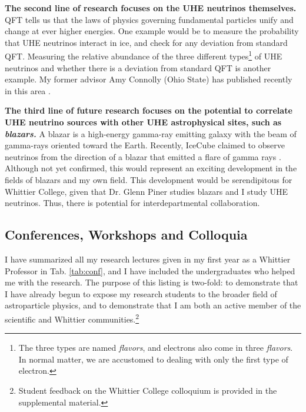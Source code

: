 \documentclass[../../main.tex]{subfiles}
\begin{document}
\textbf{The second line of research focuses on the UHE neutrinos themselves.}  QFT tells us that the laws of physics governing fundamental particles unify and change at ever higher energies.  One example would be to measure the probability that UHE neutrinos interact in ice, and check for any deviation from standard QFT.  Measuring the relative abundance of the three different types\footnote{The three types are named \textit{flavors}, and electrons also come in three \textit{flavors}.  In normal matter, we are accustomed to dealing with only the first type of electron.} of UHE neutrinos and whether there is a deviation from standard QFT is another example.  My former advisor Amy Connolly (Ohio State) has published recently in this area \cite{bustamante2017measurement} \cite{connolly2011calculation}. \\ \hspace{0.1cm}

\textbf{The third line of future research focuses on the potential to correlate UHE neutrino sources with other UHE astrophysical sites, such as \textit{blazars.}}  A blazar is a high-energy gamma-ray emitting galaxy with the beam of gamma-rays oriented toward the Earth.  Recently, IceCube claimed to observe neutrinos from the direction of a blazar that emitted a flare of gamma rays \cite{eaat2890}.  Although not yet confirmed, this would represent an exciting development in the fields of blazars and my own field.  This development would be serendipitous for Whittier College, given that Dr. Glenn Piner studies blazars \cite{piner2018multiepoch} and I study UHE neutrinos. Thus, there is potential for interdepartmental collaboration. \\ \hspace{0.1cm}

\subsection{Conferences, Workshops and Colloquia}

I have summarized all my research lectures given in my first year as a Whittier Professor in Tab. \ref{tab:conf}, and I have included the undergraduates who helped me with the research.  The purpose of this listing is two-fold: to demonstrate that I have already begun to expose my research students to the broader field of astroparticle physics, and to demonstrate that I am both an active member of the scientific and Whittier communities.\footnote{Student feedback on the Whittier College colloquium is provided in the supplemental material.}
\end{document}
